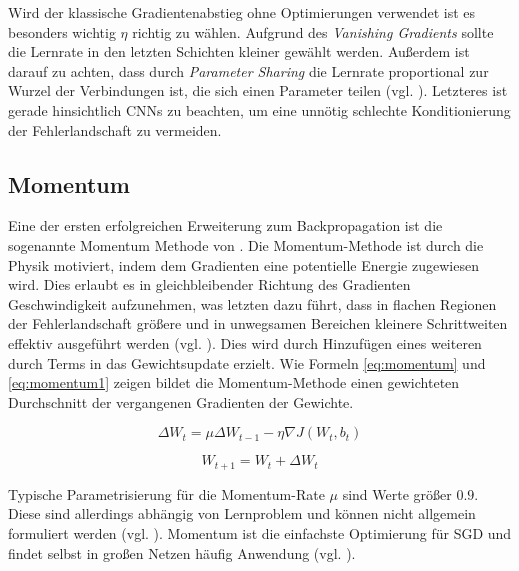Wird der klassische Gradientenabstieg ohne Optimierungen verwendet ist es besonders wichtig $\eta$ richtig zu wählen. Aufgrund des \textit{Vanishing Gradients} sollte die Lernrate in den letzten Schichten kleiner gewählt werden. Außerdem ist darauf zu achten, dass durch \textit{Parameter Sharing} die Lernrate proportional zur Wurzel der Verbindungen ist, die sich einen Parameter teilen (vgl. \cite{LeCun1998b}). Letzteres ist gerade hinsichtlich CNNs zu beachten, um eine unnötig schlechte Konditionierung der Fehlerlandschaft zu vermeiden.


\subsection{Momentum}
Eine der ersten erfolgreichen Erweiterung zum Backpropagation ist die sogenannte Momentum Methode von \cite{Polyak1964}.
Die Momentum-Methode ist durch die Physik motiviert, indem dem Gradienten eine potentielle Energie zugewiesen wird. Dies erlaubt es in gleichbleibender Richtung des Gradienten Geschwindigkeit aufzunehmen, was letzten dazu führt, dass in flachen Regionen der Fehlerlandschaft größere und in unwegsamen Bereichen kleinere Schrittweiten effektiv ausgeführt werden (vgl. \cite{LeCun1998b}).
Dies wird durch Hinzufügen eines weiteren durch Terms in das Gewichtsupdate erzielt. Wie Formeln \ref{eq:momentum} und \ref{eq:momentum1} zeigen bildet die Momentum-Methode einen gewichteten Durchschnitt der vergangenen Gradienten der Gewichte. 
 
\begin{equation}
\label{eq:momentum} 
\Delta W_t = \mu \Delta W_{t-1} - \eta \nabla J(W_t,b_t)
\end{equation} 
 
\begin{equation}
\label{eq:momentum1} 
W_{t+1} = W_t + \Delta W_t
\end{equation}

Typische Parametrisierung für die Momentum-Rate $\mu$ sind Werte größer $0.9$. Diese sind allerdings abhängig von Lernproblem und können nicht allgemein formuliert werden (vgl. \cite{Kaparthy2014}). Momentum ist die einfachste Optimierung für SGD und findet selbst in großen Netzen häufig Anwendung (vgl. \cite{Krizhevsky2012}).

